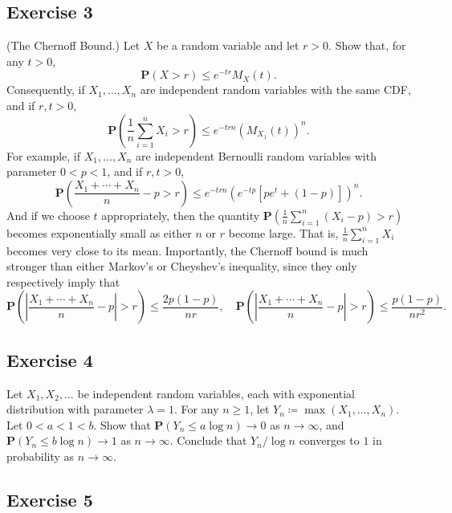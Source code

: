 \documentclass{article}
\theoremstyle{break}
\renewcommand{\P}{\mathbf{P}}
\begin{document}
\subsection*{Exercise 3}
(The Chernoff Bound.)
Let $X$ be a random variable and let $r>0$.  Show that, for any $t>0$,
\[\P(X>r)\leq e^{-tr}M_{X}(t).\]
Consequently, if $X_{1},\ldots,X_{n}$ are independent random variables with the same CDF, and if $r,t>0$,
\[\P\left(\frac{1}{n}\sum_{i=1}^{n}X_{i}>r\right)\leq e^{-trn}(M_{X_{1}}(t))^{n}.\]
For example, if $X_{1},\ldots,X_{n}$ are independent Bernoulli random variables with parameter $0<p<1$,  and if $r,t>0$,
\[\P\left(\frac{X_{1}+\cdots+X_{n}}{n}-p>r\right)\leq e^{-trn} (e^{-tp}[pe^t + (1-p)])^n.\]
And if we choose $t$ appropriately,
 then the quantity $\P\left(\frac{1}{n}\sum_{i=1}^{n}(X_{i}-p)>r\right)$ becomes exponentially small as either $n$ or $r$ become large.  That is, $\frac{1}{n}\sum_{i=1}^{n}X_{i}$ becomes very close to its mean.  Importantly, the Chernoff bound is much stronger than either Markov's or Cheyshev's inequality, since they only respectively imply that
\[\P\left( \left| \frac{X_{1}+\cdots+X_{n}}{n}-p \right| > r \right) \leq \frac{2p(1-p)}{nr},   %
\quad\P \left( \left| \frac{X_{1}+\cdots+X_{n}}{n}-p \right| >r\right)\leq \frac{p(1-p)}{nr^{2}}.\] %
%




\subsection*{Exercise 4}

Let $X_{1},X_{2},\ldots$ be independent random variables, each with exponential distribution with parameter $\lambda=1$.  For any $n \geq 1$, let $Y_{n}\coloneqq\max(X_{1},\ldots,X_{n})$.  Let $0<a<1<b$.  Show that $\P(Y_{n}\leq a\log n)\to0$ as $n\to\infty$, and $\P(Y_{n}\leq b\log n)\to1$ as $n\to\infty$.  Conclude that $Y_{n}/\log n$ converges to $1$ in probability as $n\to\infty$.




\subsection*{Exercise 5}
\end{document}
